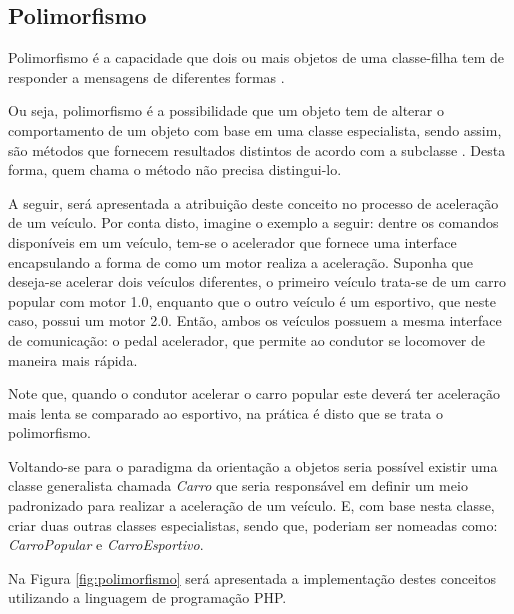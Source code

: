 \subsection{Polimorfismo}

Polimorfismo é a capacidade que dois ou mais objetos de uma classe-filha tem  de
responder a mensagens de diferentes formas
\cite{php5ConceitosProgramacaoEIntegracaoComBancoDeDados}.

Ou seja, polimorfismo é a possibilidade que um objeto tem de alterar o
comportamento de um objeto com base em uma classe especialista, sendo assim,
são métodos que fornecem resultados distintos  de acordo com a subclasse
\cite{php5ConceitosProgramacaoEIntegracaoComBancoDeDados}. Desta forma, quem
chama o método não precisa distingui-lo.

A seguir, será apresentada a atribuição deste conceito no processo de aceleração
de um veículo. Por conta disto, imagine o exemplo a seguir: dentre os comandos
disponíveis em um veículo, tem-se o acelerador que fornece uma interface
encapsulando a forma de como um motor realiza a aceleração. Suponha que
deseja-se acelerar dois veículos diferentes, o primeiro veículo trata-se de um 
carro popular com motor 1.0, enquanto que o outro veículo é um esportivo, que
neste caso, possui um motor 2.0. Então, ambos os veículos possuem a mesma
interface de comunicação: o pedal acelerador, que permite ao condutor se
locomover de maneira mais rápida.

Note que, quando o condutor acelerar o carro popular este deverá ter aceleração
mais lenta se comparado ao esportivo, na prática é disto que se trata o polimorfismo.

Voltando-se para o paradigma da orientação a objetos seria possível existir uma
classe generalista chamada \textit{Carro} que seria responsável em definir um
meio padronizado para realizar a aceleração de um veículo. E, com base nesta
classe, criar duas outras classes especialistas, sendo que, poderiam ser
nomeadas como: \textit{CarroPopular} e \textit{CarroEsportivo}.

Na Figura \ref{fig:polimorfismo} será apresentada a implementação destes conceitos
utilizando a linguagem de programação \acs{PHP}.

